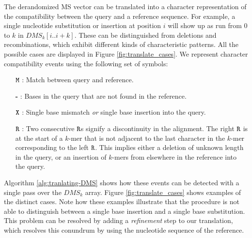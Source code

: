 \documentclass[unnumsec,webpdf,contemporary,large]{oup-authoring-template}%
\theoremstyle{thmstyleone}%
\theoremstyle{thmstyletwo}%
\theoremstyle{thmstylethree}%
\begin{document}
The derandomized MS vector can be translated into a character representation of the compatibility between the query and a reference sequence. For example, a single nucleotide substitution or insertion at position $i$ will show up as run from 0 to $k$ in $DMS_k[i..i+k]$. These can be distinguished from deletions and recombinations, which exhibit different kinds of characteristic patterns. All the possible cases are displayed in Figure \ref{fig:translate_cases}. We represent character compatibility events using the following set of symbols:
\begin{enumerate}
\item[\textbf{$\tt{M}$}]: Match between query and reference.
\item[\textbf{-}]: Bases in the query that are not found in the reference.
\item[\textbf{$\tt{X}$}]: Single base mismatch \textit{or} single base insertion into the query.
\item[\textbf{$\tt{R}$}]: Two consecutive ${\tt R}$s signify a discontinuity in the alignment. The right ${\tt R}$ is at the start of a $k$-mer that is not adjacent to the last character in the $k$-mer corresponding to the left ${\tt R}$. This implies either a deletion of unknown length in the query, or an insertion of $k$-mers from elsewhere in the reference into the query.
\end{enumerate}
Algorithm \ref{alg:tranlating-DMS} shows how these events can be detected with a single pass over the $DMS_k$ array. Figure \ref{fig:translate_cases} shows examples of the distinct cases. Note how these examples illustrate that the procedure is not able to distinguish between a single base insertion and a single base substitution. This problem can be resolved by adding a \textit{refinement} step to our translation, which resolves this conundrum by using the nucleotide sequence of the reference.

\end{document}
